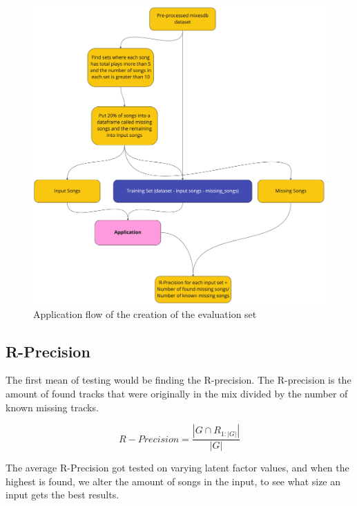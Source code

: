 \begin{figure}[H]
	\includegraphics[scale=0.1]{images/evaluation_set_app_flow}
	\centering
	\caption{Application flow of the creation of the evaluation set} 
\end{figure}


\subsection{R-Precision}
The first mean of testing would be finding the R-precision. The R-precision is the amount of found tracks that were originally in the mix divided by the number of known missing tracks.

\begin{equation}
	R-Precision = \frac{|G\cap R_{1:|G|}|}{|G|}
\end{equation}

The average R-Precision got tested on varying latent factor values, and when the highest is found, we alter the amount of songs in the input, to see what size an input gets the best results.


